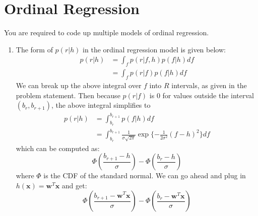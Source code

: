 \documentclass{harvardml}
\theoremstyle{plain}
\begin{document}
\section*{Ordinal Regression}

\begin{problem} You are required to
code up multiple models of ordinal regression.
\end{problem}

\begin{enumerate}
\vspace{-0.1cm}
\item
The form of $p(r |h)$ in the ordinal regression model is given below:
\begin{align*}
p(r|h) &= \int_f p(r | f,h)p(f | h) df \\
&= \int_f p(r | f)p(f |h) df \tag{f includes information from h}
\end{align*}
We can break up the above integral over $f$ into $R$ intervals, as given in the problem statement. Then because
$p(r|f)$ is $0$ for values outside the interval $(b_r, b_{r+1})$, the above integral simplifies to
\begin{align*}
p(r| h) &= \int_{b_r}^{b_{r+1}} p(f|h) df \\
&= \int_{b_r}^{b_{r+1}} \frac{1}{\sigma\sqrt{2\pi}} \exp\{-\frac{1}{2\sigma^2}(f - h)^2 \} df
\end{align*}
which can be computed as:
$$
\Phi(\frac{b_{r+1} - h}{\sigma}) - \Phi(\frac{b_r - h}{\sigma})
$$
where $\Phi$ is the CDF of the standard normal. We can go ahead and plug in $h(\mathbf{x}) = \mathbf{w}^T\mathbf{x}$ and get:
$$
\Phi(\frac{b_{r+1} - \mathbf{w}^T\mathbf{x}}{\sigma}) - \Phi(\frac{b_r - \mathbf{w}^T\mathbf{x}}{\sigma})
$$


\end{enumerate}
\end{document}
